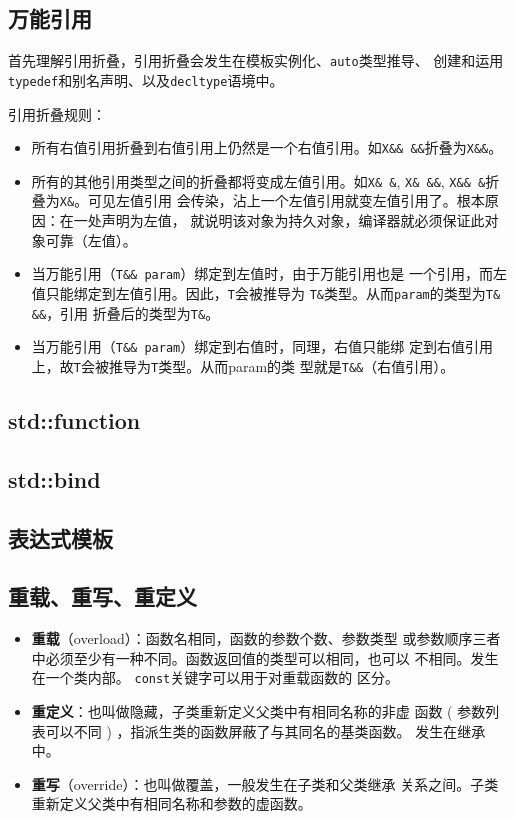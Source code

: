 \subsection{万能引用}
\label{sec:ForwardingRef}

首先理解引用折叠，引用折叠会发生在模板实例化、\texttt{auto}类型推导、
创建和运用\texttt{typedef}和别名声明、以及\texttt{decltype}语境中。

引用折叠规则：
\begin{itemize}
\item 所有右值引用折叠到右值引用上仍然是一个右值引用。如\texttt{X\&\&
    \&\&}折叠为\texttt{X\&\&}。 
\item 所有的其他引用类型之间的折叠都将变成左值引用。如\texttt{X\& \&},
  \texttt{X\& \&\&}, \texttt{X\&\& \&}折叠为\texttt{X\&}。可见左值引用
  会传染，沾上一个左值引用就变左值引用了。根本原因：在一处声明为左值，
  就说明该对象为持久对象，编译器就必须保证此对象可靠（左值）。
\end{itemize}
\begin{itemize}
\item 当万能引用（\texttt{T\&\& param}）绑定到左值时，由于万能引用也是
  一个引用，而左值只能绑定到左值引用。因此，\texttt{T}会被推导为
  \texttt{T\&}类型。从而\texttt{param}的类型为\texttt{T\& \&\&}，引用
  折叠后的类型为\texttt{T\&}。 
\item 当万能引用（\texttt{T\&\& param}）绑定到右值时，同理，右值只能绑
  定到右值引用上，故\texttt{T}会被推导为\texttt{T}类型。从而param的类
  型就是\texttt{T\&\&}（右值引用）。
\end{itemize}
\subsection{std::function}
\label{sec:function}


\subsection{std::bind}
\label{sec:bind}

 
\subsection{表达式模板}
\label{sec:ExpreesionTemp}


\subsection{重载、重写、重定义}
\label{sec:Overload}
\begin{itemize}
\item \textbf{重载}（overload）：函数名相同，函数的参数个数、参数类型
  或参数顺序三者中必须至少有一种不同。函数返回值的类型可以相同，也可以
  不相同。发生在一个类内部。 \texttt{const}关键字可以用于对重载函数的
  区分。 
\item \textbf{重定义}：也叫做隐藏，子类重新定义父类中有相同名称的非虚
  函数 ( 参数列表可以不同 ) ，指派生类的函数屏蔽了与其同名的基类函数。
  发生在继承中。 
\item \textbf{重写}（override）：也叫做覆盖，一般发生在子类和父类继承
  关系之间。子类重新定义父类中有相同名称和参数的虚函数。
\end{itemize}

